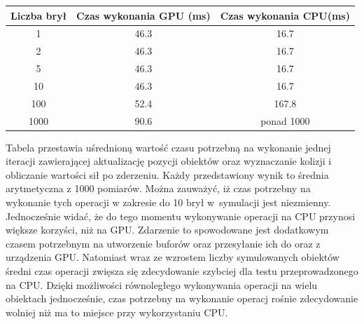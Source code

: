 \begin{tabular}{|c|c|c|}
\hline
Liczba brył & Czas wykonania GPU (ms) & Czas wykonania CPU(ms) \\
\hline
1 & 46.3 & 16.7\\
2 & 46.3 & 16.7\\
5 & 46.3 & 16.7\\
10 & 46.3 & 16.7\\
100 & 52.4 & 167.8\\
1000 & 90.6 & ponad 1000\\
\hline
\end{tabular}
\newline
\newline
\newline
Tabela przestawia uśrednioną wartość czasu potrzebną na wykonanie jednej iteracji zawierającej aktualizację pozycji obiektów oraz wyznaczanie kolizji i obliczanie wartości sił po zderzeniu. Każdy przedstawiony wynik to średnia arytmetyczna z 1000 pomiarów. Można zauważyć, iż czas potrzebny na wykonanie tych operacji w zakresie do 10 brył w~symulacji jest niezmienny. Jednocześnie widać, że do tego momentu wykonywanie operacji na CPU przynosi większe korzyści, niż na GPU. Zdarzenie to spowodowane jest dodatkowym czasem potrzebnym na utworzenie buforów oraz przesyłanie ich do oraz z urządzenia GPU. Natomiast wraz ze wzrostem liczby symulowanych obiektów średni czas operacji zwięsza się zdecydowanie szybciej dla testu przeprowadzonego na CPU. Dzięki możliwości równoległego wykonywania operacji na wielu obiektach jednocześnie, czas potrzebny na wykonanie operacj rośnie zdecydowanie wolniej niż ma to miejsce przy wykorzystaniu CPU.\\
